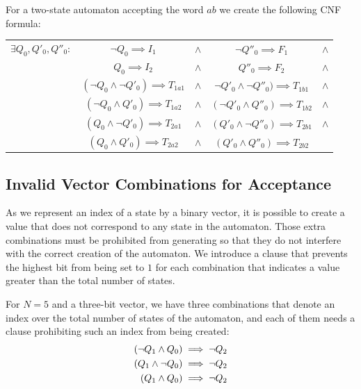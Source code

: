 For a two-state automaton accepting the word $ab$ we create the following CNF formula:

\begin{center}
    \begin{tabular}{c c c c c}
     $\exists Q_0, Q'_0, Q''_0:$ & $\neg Q_0 \implies I_1$ & $\land $ & $\neg Q''_0 \implies F_1$ & $\land $\\
      &   $Q_0 \implies I_2$    & $\land $ &   $Q''_0 \implies F_2$ & $\land $ \\ 
      &   $(\neg Q_0 \land \neg Q'_0) \implies T_{1a1}$    &  $\land $ &  $\neg Q'_0 \land \neg Q''_0) \implies T_{1b1}$   & $\land $\\
      &   $(\neg Q_0 \land Q'_0) \implies T_{1a2}$    & $\land $ &    $(\neg Q'_0 \land Q''_0) \implies T_{1b2}$  & $\land $\\
     &   $(Q_0 \land \neg Q'_0) \implies T_{2a1}$    & $\land $ &  $(Q'_0 \land \neg Q''_0)  \implies T_{2b1}$ & $\land $\\
     &   $(Q_0 \land Q'_0) \implies T_{2a2}$    &  $\land $ &  $(Q'_0 \land Q''_0) \implies T_{2b2}$ &\\
\end{tabular}
\end{center}

\subsection{Invalid Vector Combinations for Acceptance}

As we represent an index of a state by a binary vector, it is possible to create a value that does not correspond to any state in the automaton. Those extra combinations must be prohibited from generating so that they do not interfere with the correct creation of the automaton. We introduce a clause that prevents the highest bit from being set to $1$ for each combination that indicates a value greater than the total number of states.

For $N=5$ and a three-bit vector, we have three combinations that denote an index over the total number of states of the automaton, and each of them needs a clause prohibiting such an index from being created:
\begin{align*}
    \centering
    (\neg Q_1 \land Q_0) & \implies \neg Q_2 \\
    (Q_1 \land \neg Q_0) & \implies \neg Q_2 \\
    (Q_1 \land Q_0) & \implies \neg Q_2
\end{align*}

